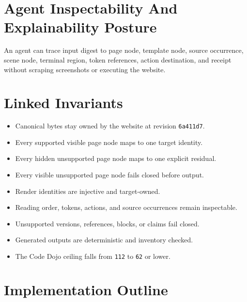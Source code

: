 \section{Agent Inspectability And Explainability Posture}\label{record-146-agent-inspectability-and-explainability-posture}

An agent can trace input digest to page node, template node, source occurrence, scene node, terminal region, token references, action destination, and receipt without scraping screenshots or executing the website.

\section{Linked Invariants}\label{record-146-linked-invariants}

\begin{itemize}
\tightlist
\item
  Canonical bytes stay owned by the website at revision \texttt{6\allowbreak{}a\allowbreak{}4\allowbreak{}1\allowbreak{}1\allowbreak{}d\allowbreak{}7}.
\item
  Every supported visible page node maps to one target identity.
\item
  Every hidden unsupported page node maps to one explicit residual.
\item
  Every visible unsupported page node fails closed before output.
\item
  Render identities are injective and target-owned.
\item
  Reading order, tokens, actions, and source occurrences remain inspectable.
\item
  Unsupported versions, references, blocks, or claims fail closed.
\item
  Generated outputs are deterministic and inventory checked.
\item
  The Code Dojo ceiling falls from \texttt{1\allowbreak{}1\allowbreak{}2} to \texttt{6\allowbreak{}2} or lower.
\end{itemize}

\section{Implementation Outline}\label{record-146-implementation-outline}

